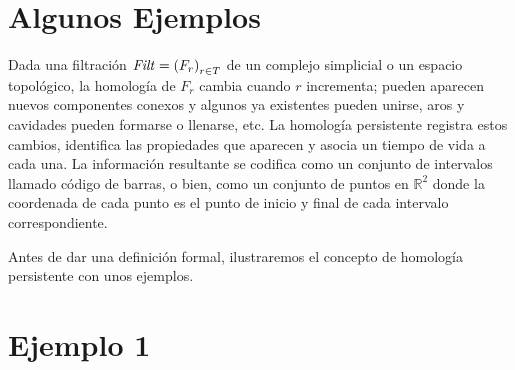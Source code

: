 \section{Algunos Ejemplos}

Dada una filtraci\'on $\mathit{Filt} = \left(F_{r}\right)_{r\in T}$ de un complejo simplicial o un espacio
topol\'ogico, la homolog\'ia de $F_{r}$ cambia cuando $r$ incrementa; pueden aparecen nuevos componentes
conexos y algunos ya existentes pueden unirse, aros y cavidades pueden formarse o llenarse, etc. La
homolog\'ia persistente registra estos cambios, identifica las propiedades que aparecen y asocia un
tiempo de vida a cada una. La informaci\'on resultante se codifica como un conjunto de intervalos llamado
c\'odigo de barras, o bien, como un conjunto de puntos en $\mathbb{R}^{2}$ donde la coordenada de
cada punto es el punto de inicio y final de cada intervalo correspondiente.

Antes de dar una definici\'on formal, ilustraremos el concepto de homolog\'ia persistente con unos
ejemplos.


\section*{Ejemplo 1}

